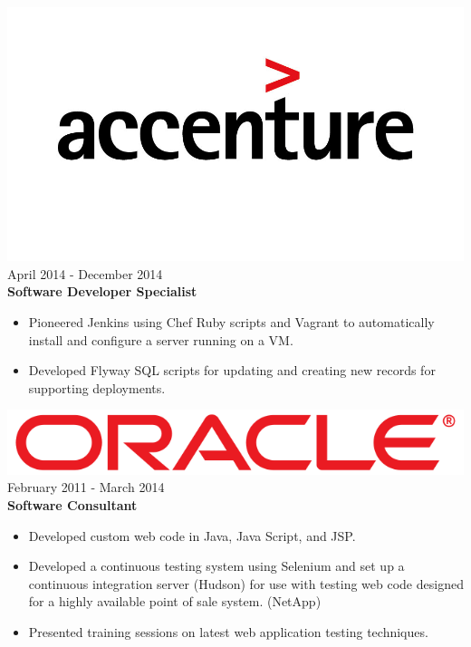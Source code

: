 \documentclass[12pt, line, margin]{res}
\begin{document}
\begin{resume}
	      {\sl  \includegraphics[scale=0.1, trim=110 200 110 120]{resume_images/accenture-logo.jpg}} \hfill April 2014 - December 2014 \\
                \textbf{Software Developer Specialist}
                 \begin{itemize}  \itemsep -2pt %
                \item   Pioneered Jenkins using Chef Ruby scripts and Vagrant\newline
                               to automatically install and configure a server running on a VM.
	      \item   Developed Flyway SQL scripts for updating and creating new 
                               records for supporting deployments.
                \end{itemize}

                {\sl \includegraphics[scale=0.1]{resume_images/663px-Oracle_logo.png}} \hfill            February 2011 - March 2014 \\
                \textbf{Software Consultant}
                \begin{itemize}  \itemsep -2pt %
	      \item Developed custom web code in Java, Java Script, and JSP.
	      \item Developed a continuous testing system using Selenium
                               and set up a continuous integration server (Hudson)
                               for use with testing web code designed for a
                               highly available point of sale system. (NetApp)
	      \item Presented training sessions on latest web application testing \newline
                               techniques.
                 \end{itemize} 


\end{resume}
\end{document}
